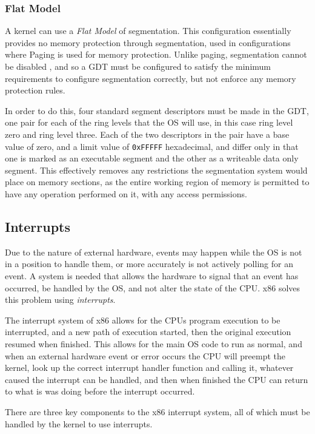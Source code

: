 \documentclass[10pt]{report}
\begin{document}
\subsubsection{Flat Model}
A kernel can use a \textit{Flat Model} of segmentation. This configuration essentially provides no memory protection through segmentation, used in configurations where Paging is used for memory protection. Unlike paging, segmentation cannot be disabled \cite{guide2011intel}, and so a GDT must be configured to satisfy the minimum requirements to configure segmentation correctly, but not enforce any memory protection rules.

In order to do this, four standard segment descriptors must be made in the GDT, one pair for each of the ring levels that the OS will use, in this case ring level zero and ring level three. Each of the two descriptors in the pair have a base value of zero, and a limit value of \texttt{0xFFFFF} hexadecimal, and differ only in that one is marked as an executable segment and the other as a writeable data only segment. This effectively removes any restrictions the segmentation system would place on memory sections, as the entire working region of memory is permitted to have any operation performed on it, with any access permissions.

\subsection{Interrupts}
Due to the nature of external hardware, events may happen while the OS is not in a position to handle them, or more accurately is not actively polling for an event. A system is needed that allows the hardware to signal that an event has occurred, be handled by the OS, and not alter the state of the CPU. x86 solves this problem using \textit{interrupts}.

The interrupt system of x86 allows for the CPUs program execution to be interrupted, and a new path of execution started, then the original execution resumed when finished.
This allows for the main OS code to run as normal, and when an external hardware event or error occurs the CPU will preempt the kernel, look up the correct interrupt handler function and calling it, whatever caused the interrupt can be handled, and then when finished the CPU can return to what is was doing before the interrupt occurred.

There are three key components to the x86 interrupt system, all of which must be handled by the kernel to use interrupts.
\end{document}
